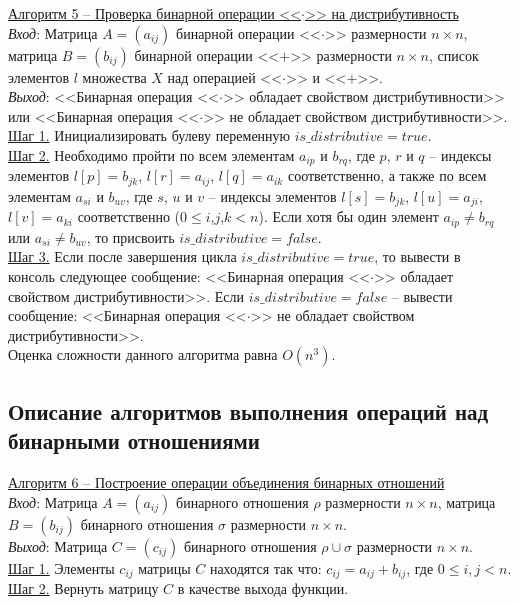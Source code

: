 \documentclass[bachelor, och, labwork]{shiza}
\begin{document}
        \underline{Алгоритм 5 -- Проверка бинарной операции <<$\cdot$>> на дистрибутивность}\\
            \textit{Вход}: Матрица $A = (a_{ij})$ бинарной операции <<$\cdot$>> размерности $n \times n$, матрица $B = (b_{ij})$ бинарной 
            операции <<$+$>> размерности $n \times n$, список элементов $l$ множества $X$ над операцией <<$\cdot$>> и <<$+$>>.\\
            \textit{Выход}: <<Бинарная операция <<$\cdot$>> обладает свойством дистрибутивности>> или 
            <<Бинарная операция <<$\cdot$>> не обладает свойством дистрибутивности>>.\\
            \underline{Шаг 1.} Инициализировать булеву переменную $is\_distributive = true$.\\
            \underline{Шаг 2.} Необходимо пройти по всем элементам $a_{ip}$ и $b_{rq}$, где $p$, $r$ и $q$ -- 
            индексы элементов $l[p] = b_{jk}$, $l[r] = a_{ij}$, $l[q] = a_{ik}$ соответственно, а также по всем элементам $a_{si}$ и $b_{uv}$, 
            где $s$, $u$ и $v$ -- индексы элементов $l[s] = b_{jk}$, $l[u] = a_{ji}$, $l[v] = a_{ki}$ 
            соответственно ($0 \leq i$,$j$,$k < n$). Если хотя бы один элемент $a_{ip} \neq b_{rq}$ или 
            $a_{si} \neq b_{uv}$, то присвоить $is\_distributive = false$.\\
            \underline{Шаг 3.} Если после завершения цикла $is\_distributive = true$, то вывести в консоль следующее сообщение:
            <<Бинарная операция <<$\cdot$>> обладает свойством дистрибутивности>>. Если $is\_distributive = false$ -- вывести сообщение:
            <<Бинарная операция <<$\cdot$>> не обладает свойством дистрибутивности>>.\\
            
            Оценка сложности данного алгоритма равна $O(n^3)$.\\
        
    \subsection{Описание алгоритмов выполнения операций над бинарными отношениями}
        \underline{Алгоритм 6 -- Построение операции объединения бинарных отношений}\\
            \textit{Вход}: Матрица $A = (a_{ij})$ бинарного отношения $\rho$ размерности $n \times n$, матрица $B = (b_{ij})$ 
            бинарного отношения $\sigma$ размерности $n \times n$.\\
            \textit{Выход}: Матрица $C = (c_{ij})$ бинарного отношения $\rho \cup \sigma$ размерности $n \times n$.\\
            \underline{Шаг 1.} Элементы $c_{ij}$ матрицы $C$ находятся так что: $c_{ij} = a_{ij} + b_{ij}$, где
            $0 \leq i, j < n$. \\
            \underline{Шаг 2.} Вернуть матрицу $C$ в качестве выхода функции.\\
            
\end{document}

